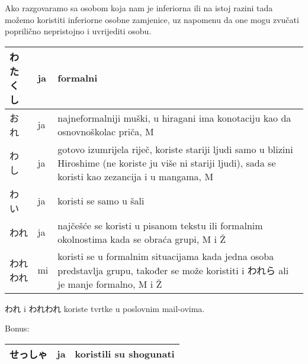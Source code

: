 	\vspace{10pt}
	
	
		Ako razgovaramo sa osobom koja nam je inferiorna ili na istoj razini tada možemo koristiti inferiorne osobne zamjenice, uz napomenu da one mogu zvučati poprilično nepristojno i uvrijediti osobu.
		
		\vspace{15pt}
	
	\vspace{10pt}
	
	
	
	\vspace{10pt}
	
	\begin{tabular}{|l|l|p{400pt}|}
		\hline
		わたくし&ja&formalni\\\hline
		おれ&ja&najneformalniji muški, u hiragani ima konotaciju kao da osnovnoškolac priča, M\\\hline
		わし&ja&gotovo izumrijela riječ, koriste stariji ljudi samo u blizini Hiroshime (ne koriste ju više ni stariji ljudi), sada se koristi kao zezancija i u mangama, M\\\hline
		わい&ja&koristi se samo u šali\\\hline
		われ&ja&najčešće se koristi u pisanom tekstu ili formalnim okolnostima kada se obraća grupi, M i Ž\\\hline
		われわれ&mi&koristi se u formalnim situacijama kada jedna osoba predstavlja grupu, također se može koristiti i われら ali je manje formalno, M i Ž\\\hline
	\end{tabular}

	\vspace{10pt}	
	
	われ i われわれ koriste tvrtke u poslovnim mail-ovima.
	
	\vspace{10pt}
	
	Bonus:
	\begin{tabular}{|l|l|l|}
		\hline
		せっしゃ&ja&koristili su shogunati\\\hline
	\end{tabular}
	
	\newpage
	

	\ten {}



